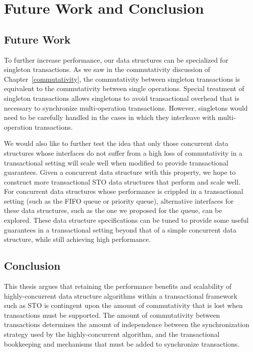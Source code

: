 \chapter{Future Work and Conclusion}

\section{Future Work}
To further increase performance, our data structures can be specialized for singleton transactions. As we saw in the commutativity discussion of Chapter~\ref{commutativity}, the commutativity between singleton transactions is equivalent to the commutativity between single operations. Special treatment of singleton transactions allows singletons to avoid transactional overhead that is necessary to synchronize multi-operation transactions. However, singletons would need to be carefully handled in the cases in which they interleave with multi-operation transactions. 

We would also like to further test the idea that only those concurrent data structures whose interfaces do not suffer from a high loss of commutativity in a transactional setting will scale well when modified to provide transactional guarantees. Given a concurrent data structure with this property, we hope to construct more transactional STO data structures that perform and scale well.
For concurrent data structures whose performance is crippled in a transactional setting (such as the FIFO queue or priority queue), alternative interfaces for these data structures, such as the one we proposed for the queue, can be explored. These data structure specifications can be tuned to provide some useful guarantees in a transactional setting beyond that of a simple concurrent data structure, while still achieving high performance. 

\section{Conclusion}
This thesis argues that retaining the performance benefits and scalability of highly-concurrent data structure algorithms within a transactional framework such as STO is contingent upon the amount of commutativity that is lost when transactions must be supported. The amount of commutativity between transactions determines the amount of independence between the synchronization strategy used by the highly-concurrent algorithm, and the transactional bookkeeping and mechanisms that must be added to synchronize transactions.

